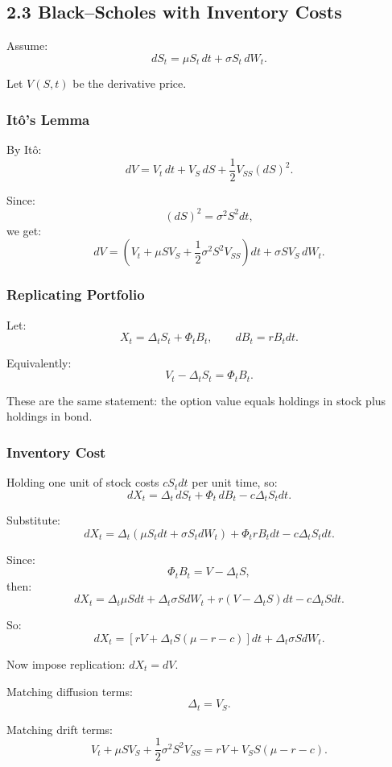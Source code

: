\documentclass[11pt]{article}
\begin{document}

\subsection*{2.3 Black--Scholes with Inventory Costs}

Assume:
\[
dS_t=\mu S_t\,dt+\sigma S_t\,dW_t.
\]

Let $V(S,t)$ be the derivative price.

\subsubsection*{It\^o's Lemma}

By It\^o:
\[
dV=V_t\,dt+V_S\,dS+\frac12V_{SS}(dS)^2.
\]

Since:
\[
(dS)^2=\sigma^2S^2dt,
\]
we get:
\[
dV=
\left(V_t+\mu SV_S+\frac12\sigma^2S^2V_{SS}\right)dt
+\sigma SV_S\,dW_t.
\]

\subsubsection*{Replicating Portfolio}

Let:
\[
X_t=\Delta_t S_t+\Phi_t B_t,
\qquad dB_t=rB_tdt.
\]

Equivalently:
\[
V_t-\Delta_tS_t=\Phi_tB_t.
\]

These are the same statement: the option value equals holdings in stock plus holdings in bond.

\subsubsection*{Inventory Cost}

Holding one unit of stock costs $cS_tdt$ per unit time, so:
\[
dX_t=\Delta_t\,dS_t+\Phi_t\,dB_t-c\Delta_tS_tdt.
\]

Substitute:
\[
dX_t=
\Delta_t(\mu S_tdt+\sigma S_tdW_t)+\Phi_trB_tdt-c\Delta_tS_tdt.
\]

Since:
\[
\Phi_tB_t=V-\Delta_tS,
\]
then:
\[
dX_t=
\Delta_t\mu Sdt+\Delta_t\sigma SdW_t+r(V-\Delta_tS)dt-c\Delta_tSdt.
\]

So:
\[
dX_t=
\left[rV+\Delta_tS(\mu-r-c)\right]dt+\Delta_t\sigma SdW_t.
\]

Now impose replication: $dX_t=dV$.

Matching diffusion terms:
\[
\Delta_t=V_S.
\]

Matching drift terms:
\[
V_t+\mu SV_S+\frac12\sigma^2S^2V_{SS}
=
rV+V_SS(\mu-r-c).
\]
\end{document}
